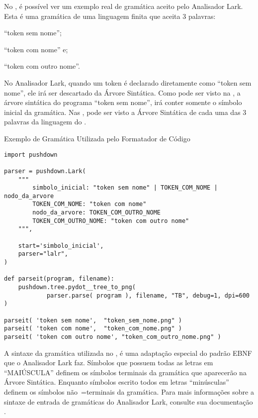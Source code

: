No ,
é possível ver um exemplo real de gramática aceito pelo Analisador Lark.
Esta é uma gramática de uma linguagem finita que aceita 3 palavras:
\begin{inparaenum}[1)]
\item ``token sem nome'';
\item ``token com nome'' e;
\item ``token com outro nome''.
\end{inparaenum}%
No Analisador Lark,
quando um token é declarado diretamente como ``token sem nome'',
ele irá ser descartado da Árvore Sintática.
Como pode ser visto na ,
a árvore sintática do programa ``token sem nome'',
irá conter somente o símbolo inicial da gramática.
Nas ,
pode ser visto a Árvore Sintática de cada uma das 3 palavras da linguagem do .
\begin{code}
\caption{Exemplo de Gramática Utilizada pelo Formatador de Código}
\label{code:ExemploDeGramaticaLark}
\begin{verbatim}
import pushdown

parser = pushdown.Lark(
    """
        simbolo_inicial: "token sem nome" | TOKEN_COM_NOME | nodo_da_arvore
        TOKEN_COM_NOME: "token com nome"
        nodo_da_arvore: TOKEN_COM_OUTRO_NOME
        TOKEN_COM_OUTRO_NOME: "token com outro nome"
    """,

    start='simbolo_inicial',
    parser="lalr",
)

def parseit(program, filename):
    pushdown.tree.pydot__tree_to_png(
            parser.parse( program ), filename, "TB", debug=1, dpi=600 )

parseit( 'token sem nome',  "token_sem_nome.png" )
parseit( 'token com nome',  "token_com_nome.png" )
parseit( 'token com outro nome', "token_com_outro_nome.png" )
\end{verbatim}
\end{code}

A sintaxe da gramática utilizada no ,
é uma adaptação especial do padrão EBNF que o Analisador Lark faz.
Símbolos que possuem todas as letras em ``MAIÚSCULA'' definem os símbolos terminais da gramática que aparecerão na Árvore Sintática.
Enquanto símbolos escrito todos em letras ``minúsculas'' definem os símbolos não~=terminais da gramática.
Para mais informações sobre a sintaxe de entrada de gramáticas do Analisador Lark,
consulte sua documentação \cite{larkGrammarReference,larkStyleCheat}.

